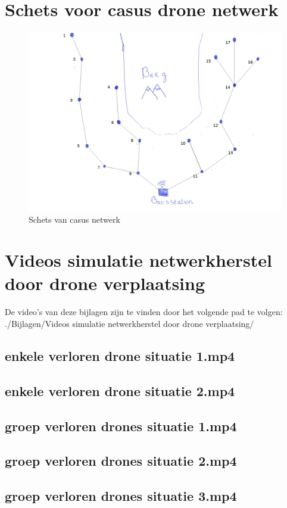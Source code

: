 \documentclass[a4paper, 11pt, oneside]{report}
\begin{document}



\clearpage
\appendix
\chapter{Schets voor casus drone netwerk}
 \label{app:schetsNetwerk}
\begin{figure}[H]
	\begin{center}\includegraphics[width=\linewidth]{schetsNetwerk}\end{center}
	\caption{Schets van casus netwerk}
	\label{fig:schetsNetwerk}
\end{figure}

\chapter{Videos simulatie netwerkherstel door drone verplaatsing}\label{sec:videos-simulatie-netwerkherstel-door-drone-verplaatsing}
De video's van deze bijlagen zijn te vinden door het volgende pad te volgen: \newline
./Bijlagen/Videos simulatie netwerkherstel door drone verplaatsing/
\section{enkele verloren drone situatie 1.mp4}\label{sec:enkele-verloren-drone-situatie-1mp4}
\section{enkele verloren drone situatie 2.mp4}\label{sec:enkele-verloren-drone-situatie-2mp4}
\section{groep verloren drones situatie 1.mp4}\label{sec:groep-verloren-drones-situatie-1mp4}
\section{groep verloren drones situatie 2.mp4}\label{sec:groep-verloren-drones-situatie-2mp4}
\section{groep verloren drones situatie 3.mp4}\label{sec:groep-verloren-drones-situatie-3mp4}
\end{document}
